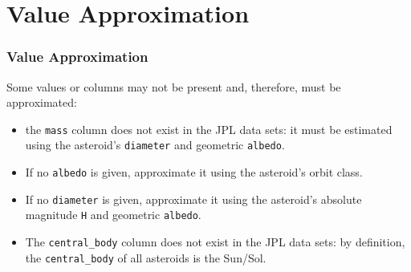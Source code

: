 \section{Value Approximation}
\begin{frame}
    \frametitle{Value Approximation}
    
    Some values or columns may not be present and, therefore, must be approximated:
    \begin{itemize}
        \item the \texttt{mass} column does not exist in the JPL data sets: it must be estimated using the asteroid's \texttt{diameter} and geometric \texttt{albedo}.
        \item If no \texttt{albedo} is given, approximate it using the asteroid's orbit class.
        \item If no \texttt{diameter} is given, approximate it using the asteroid's absolute magnitude \texttt{H} and geometric \texttt{albedo}.
        \item The \texttt{central\_body} column does not exist in the JPL data sets: by definition, the \texttt{central\_body} of all asteroids is the Sun/Sol.
    \end{itemize}
\end{frame}


